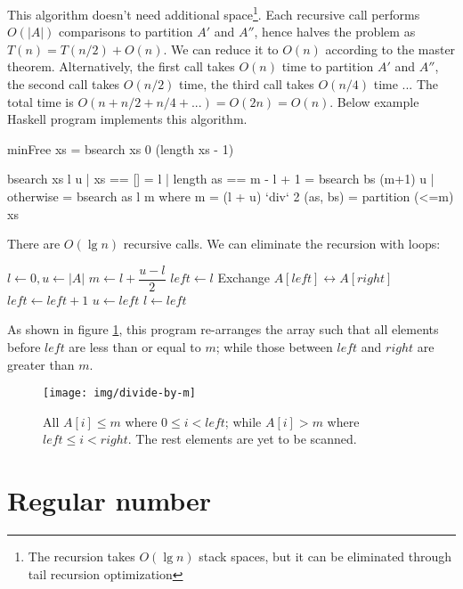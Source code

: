 \documentclass[b5paper]{article}
\begin{document}
This algorithm doesn't need additional space\footnote{The recursion takes $O(\lg n)$ stack spaces, but it can be eliminated through tail recursion optimization}. Each recursive call performs $O(|A|)$ comparisons to partition $A'$ and $A''$, hence halves the problem as $T(n) = T(n/2) + O(n)$. We can reduce it to $O(n)$ according to the master theorem. Alternatively, the first call takes $O(n)$ time to partition $A'$ and $A''$, the second call takes $O(n/2)$ time, the third call takes $O(n/4)$ time ... The total time is $O(n + n/2 + n/4 + ...) = O(2n) = O(n)$. Below example Haskell program implements this algorithm.

\lstset{frame = single}
\begin{Haskell}
minFree xs = bsearch xs 0 (length xs - 1)

bsearch xs l u | xs == [] = l
               | length as == m - l + 1 = bsearch bs (m+1) u
               | otherwise = bsearch as l m
    where
      m = (l + u) `div` 2
      (as, bs) = partition (<=m) xs
\end{Haskell}

There are $O(\lg n)$ recursive calls. We can eliminate the recursion with loops:

\begin{algorithmic}[1]
  \State $l \gets 0, u \gets |A|$
    \State $m \gets l + \dfrac{u - l}{2}$
    \State $left \gets l$
        \State Exchange $A[left] \leftrightarrow A[right]$
        \State $left \gets left + 1$
      \EndIf
    \EndFor
      \State $u \gets left$
    \Else
      \State $l \gets left$
    \EndIf
  \EndWhile
\EndFunction
\end{algorithmic}

As shown in figure \cref{fig:divide}, this program re-arranges the array such that all elements before $left$ are less than or equal to $m$; while those between $left$ and $right$ are greater than $m$.

\begin{figure}[htbp]
  \centering
  \texttt{[image: img/divide-by-m]}
  \caption{All $A[i] \leq m$ where $0 \leq i < left$; while $A[i] > m$ where $left \leq i < right$. The rest elements are yet to be scanned.}
  \label{fig:divide}
\end{figure}

\section*{Regular number}
\end{document}
